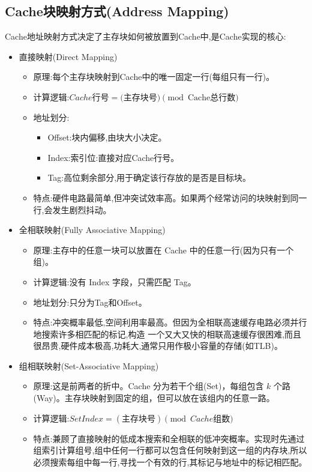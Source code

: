 \subsection{Cache块映射方式(Address Mapping)}
Cache地址映射方式决定了主存块如何被放置到Cache中,是Cache实现的核心:
\begin{itemize}
    \item 直接映射(Direct Mapping)
    \begin{itemize}
        \item 原理:每个主存块映射到Cache中的唯一固定一行(每组只有一行)。
        \item 计算逻辑:$Cache\text{行号} = \text{(主存块号)} \pmod {\text{Cache总行数}}$
        \item 地址划分:
        \begin{itemize}
            \item Offset:块内偏移,由块大小决定。
            \item Index:索引位:直接对应Cache行号。
            \item Tag:高位剩余部分,用于确定该行存放的是否是目标块。
        \end{itemize}
        \item 特点:硬件电路最简单,但冲突试效率高。如果两个经常访问的块映射到同一行,会发生剧烈抖动。
    \end{itemize}
    \item 全相联映射(Fully Associative Mapping)
    \begin{itemize}
        \item 原理:主存中的任意一块可以放置在 Cache 中的任意一行(因为只有一个组)。
        \item 计算逻辑:没有 Index 字段，只需匹配 Tag。
        \item 地址划分:只分为Tag和Offset。
        \item 特点:冲突概率最低,空间利用率最高。但因为全相联高速缓存电路必须并行地搜索许多相匹配的标记,构造
一个又大又快的相联高速缓存很困难,而且很昂贵,硬件成本极高,功耗大,通常只用作极小容量的存储(如TLB)。
    \end{itemize}
    \item 组相联映射(Set-Associative Mapping)
    \begin{itemize}
        \item 原理:这是前两者的折中。Cache 分为若干个组(Set)，每组包含 $k$ 个路(Way)。主存块映射到固定的组，但可以放在该组内的任意一路。
        \item 计算逻辑:$Set Index = (\text{主存块号}) \pmod { Cache\text{组数}}$
        \item 特点:兼顾了直接映射的低成本搜索和全相联的低冲突概率。实现时先通过组索引计算组号,组中任何一行都可以包含任何映射到这一组的内存块,所以
必须搜索每组中每一行,寻找一个有效的行,其标记与地址中的标记相匹配。
    \end{itemize}
\end{itemize}

